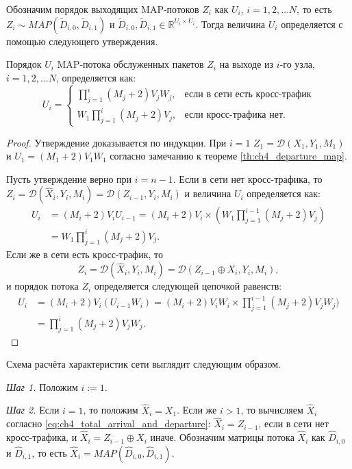 Обозначим порядок выходящих MAP-потоков $Z_i$ как $U_i$, $i=1,2,\dots N$, то есть $Z_i \sim MAP(\tilde{D}_{i,0}, \tilde{D}_{i,1})$ и $\tilde{D}_{i,0}, \tilde{D}_{i,1} \in \mathbb{R}^{U_i \times U_i}$. Тогда величина $U_i$ определяется с помощью следующего утверждения.

\begin{prop}\label{prop:ch4_departure_order}
	Порядок $U_i$ MAP-потока обслуженных пакетов $Z_i$ на выходе из $i$-го узла, $i = 1,2,\dots N$, определяется как:
	$$
	U_i = \begin{cases}
		\prod\limits_{j=1}^{i}(M_j + 2)V_jW_j,&\text{если в сети есть кросс-трафик}\\
		W_1\prod\limits_{j=1}^{i}(M_j + 2)V_j,&\text{если кросс-трафика нет}.
	\end{cases}
	$$
\end{prop}
\begin{proof}
Утверждение доказывается по индукции. При $i = 1$ $Z_1 = \mathcal{D}(X_1, Y_1, M_1)$ и $U_1 = (M_1 + 2)V_1W_1$ согласно замечанию к теореме \ref{th:ch4_departure_map}. 

Пусть утверждение верно при $i = n-1$. Если в сети нет кросс-трафика, то $Z_i = \mathcal{D}(\hat{X}_i, Y_i, M_i) = \mathcal{D}(Z_{i-1}, Y_i, M_i)$ и величина $U_i$ определяется как:
$$
  \begin{aligned}
    U_i &= (M_i + 2) V_i U_{i-1} = (M_i + 2) V_i \times (W_1 \prod\limits_{j=1}^{i-1}(M_j + 2)V_j)\\
    &= W_1 \prod\limits_{j=1}^{i}(M_j + 2)V_j.
  \end{aligned}
$$
Если же в сети есть кросс-трафик, то 
$$
  Z_i = \mathcal{D}(\hat{X}_i, Y_i, M_i) = \mathcal{D}(Z_{i-1} \oplus X_i, Y_i, M_i),
$$
и порядок потока $Z_i$ определяется следующей цепочкой равенств:
$$
  \begin{aligned}
    U_i &= (M_i + 2) V_i (U_{i-1} W_i) = (M_i + 2) V_i W_i \times \prod\limits_{j=1}^{i-1}(M_j + 2) V_j W_j)\\
    &= \prod\limits_{j=1}^{i}(M_j + 2) V_j W_j.
  \end{aligned}
$$
\end{proof}

Схема расчёта характеристик сети выглядит следующим образом.

\textit{Шаг 1.} Положим $i := 1$.

\textit{Шаг 2.} Если $i = 1$, то положим $\hat{X}_i = X_1$. Если же $i > 1$, то вычисляем $\hat{X}_i$ согласно \eqref{eq:ch4_total_arrival_and_departure}: $\hat{X}_i = Z_{i-1}$, если в сети нет кросс-трафика, и $\hat{X}_i = Z_{i-1} \oplus X_i$ иначе. Обозначим матрицы потока $\hat{X}_i$ как $\hat{D}_{i,0}$ и $\hat{D}_{i,1}$, то есть $\hat{X}_i = MAP(\hat{D}_{i,0}, \hat{D}_{i,1})$.

